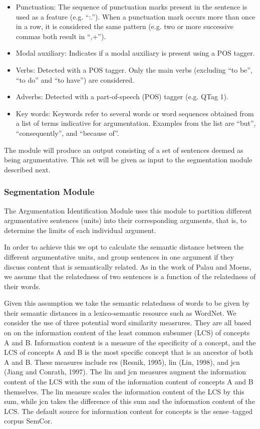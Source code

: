 \begin{itemize}
\item Punctuation: The sequence of punctuation marks present in the sentence is used as a feature (e.g. ``:.''). When a punctuation mark occurs more than once in a row, it is considered the same pattern (e.g. two or more successive commas both result in ``,+'').
\item Modal auxiliary: Indicates if a modal auxiliary is present using a POS tagger.
\item Verbs: Detected with a POS tagger. Only the main verbs (excluding ``to be'', ``to do'' and ``to have'') are considered.
\item Adverbs: Detected with a part-of-speech (POS) tagger (e.g. QTag 1).
\item Key words:  Keywords refer to several words or word sequences obtained from a list of terms indicative for argumentation. Examples from the list are ``but'', ``consequently'', and ``because of''.
\end{itemize}

The module will produce an output consisting of a set of sentences deemed as being argumentative. This set will be given as input to the segmentation module described next.

\subsubsection{Segmentation Module}
\par
The Argumentation Identification Module uses this module to partition different argumentative sentences (units) into their corresponding arguments, that is, to determine the limits of each individual argument.
\par
In order to achieve this we opt to calculate the semantic distance between the different argumentative units, and group sentences in one argument if they discuss content that is semantically related. As in the work of Palau and Moens\cite{Palau}, we assume that the relatedness of two sentences is a function of the relatedness of their words.
\par
Given this assumption we take the semantic relatedness of words to be given by their semantic distances in a lexico-semantic resource such as WordNet. We consider the use of three potential word similarity measrures.
They are all based on on the information content of the least common subsumer (LCS)
of concepts A and B. Information content is a measure of the specificity of a concept, and the LCS of concepts A and B is the most specific concept that is an ancestor of
both A and B. These measures include res (Resnik, 1995)\cite{Resnik}, lin (Lin, 1998)\cite{lin}, and jcn (Jiang and Conrath, 1997)\cite{jcn}.
The lin and jcn measures augment the information content of the LCS with the sum of the information content
of concepts A and B themselves. The lin measure scales the information content of the LCS by this sum, while jcn takes the difference of this sum and the information content of the LCS.
The default source for information content for concepts is the sense–tagged corpus SemCor.

